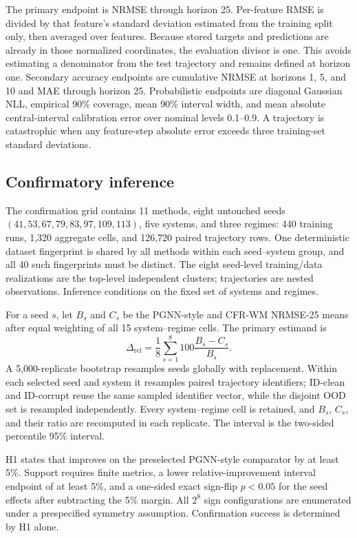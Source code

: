 The primary endpoint is NRMSE through horizon 25. Per-feature RMSE is divided
by that feature's standard deviation estimated from the training split only,
then averaged over features. Because stored targets and predictions are already
in those normalized coordinates, the evaluation divisor is one. This avoids
estimating a denominator from the test trajectory and remains defined at
horizon one. Secondary accuracy endpoints are cumulative NRMSE at horizons 1,
5, and 10 and MAE through horizon 25. Probabilistic endpoints are diagonal
Gaussian NLL, empirical 90\% coverage, mean 90\% interval width, and mean
absolute central-interval calibration error over nominal levels 0.1--0.9. A
trajectory is catastrophic when any feature-step absolute error exceeds three
training-set standard deviations.

\subsection{Confirmatory inference}

The confirmation grid contains 11 methods, eight untouched seeds
$(41,53,67,79,83,97,109,113)$, five systems, and three regimes: 440 training
runs, 1,320 aggregate cells, and 126,720 paired trajectory rows. One
deterministic dataset fingerprint is shared by all methods within each
seed--system group, and all 40 such fingerprints must be distinct. The eight
seed-level training/data realizations are the top-level independent clusters;
trajectories are nested observations. Inference conditions on the fixed set of
systems and regimes.

For a seed $s$, let $B_s$ and $C_s$ be the PGNN-style and CFR-WM NRMSE-25 means after
equal weighting of all 15 system--regime cells. The primary estimand is
\begin{equation}
 \Delta_{\mathrm{rel}}=\frac{1}{8}\sum_{s=1}^{8}
 100\frac{B_s-C_s}{B_s}.
 \label{eq:primary-estimand}
\end{equation}
A 5,000-replicate bootstrap resamples seeds globally with replacement. Within
each selected seed and system it resamples paired trajectory identifiers;
ID-clean and ID-corrupt reuse the same sampled identifier vector, while the
disjoint OOD set is resampled independently. Every system--regime cell is
retained, and $B_s$, $C_s$, and their ratio are recomputed in each replicate.
The interval is the two-sided percentile 95\% interval.

H1 states that \method{} improves on the preselected PGNN-style comparator by at least 5\%.
Support requires finite metrics, a lower relative-improvement interval endpoint
of at least 5\%, and a one-sided exact sign-flip $p<0.05$ for the seed effects
after subtracting the 5\% margin. All $2^8$ sign configurations are enumerated
under a prespecified symmetry assumption. Confirmation success is determined
by H1 alone.

